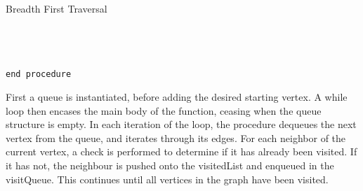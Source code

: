 \documentclass[a4paper]{article}
\begin{document}
\pagebreak

\begin{algorithm}
\caption{Breadth First Traversal}\label{euclid}
\begin{algorithmic}[1]
 \\

 \\
\State{}
\State{}
\State\quad{}
\State\quad{}
\State\quad\quad{}
\State\quad\quad{}
\State\quad{}
\State{}
 \\

{\tt end procedure}
\EndProcedure
\end{algorithmic}
\end{algorithm}



First a queue is instantiated, before adding the desired starting vertex.
A while loop then encases the main body of the function, 
ceasing when the queue structure is empty.
In each iteration of the loop, the procedure dequeues the next vertex from the queue,
and iterates through its edges. 
For each neighbor of the current vertex,
a check is performed to determine if it has already been visited.
If it has not, the neighbour is pushed onto the visitedList and enqueued in the visitQueue.
This continues until all vertices in the graph have been visited. \\


\end{document}
